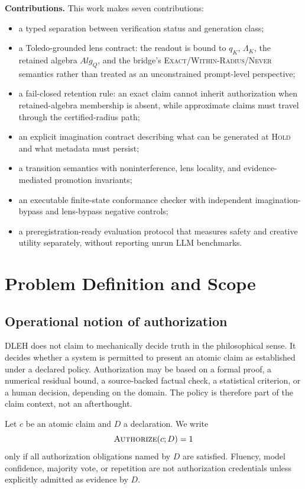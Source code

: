 \documentclass[10pt,twocolumn]{article}
\begin{document}
\noindent\textbf{Contributions.} This work makes seven contributions:
\begin{itemize}[leftmargin=1.4em,itemsep=1pt,topsep=2pt]
\item a typed separation between verification status and generation class;
\item a Toledo-grounded lens contract: the readout is bound to $q_K$, $\Lambda_K$, the retained algebra $Alg_Q$, and the bridge's \textsc{Exact}/\textsc{Within-Radius}/\textsc{Never} semantics rather than treated as an unconstrained prompt-level perspective;
\item a fail-closed retention rule: an exact claim cannot inherit authorization when retained-algebra membership is absent, while approximate claims must travel through the certified-radius path;
\item an explicit imagination contract describing what can be generated at \textsc{Hold} and what metadata must persist;
\item a transition semantics with noninterference, lens locality, and evidence-mediated promotion invariants;
\item an executable finite-state conformance checker with independent imagination-bypass and lens-bypass negative controls;
\item a preregistration-ready evaluation protocol that measures safety and creative utility separately, without reporting unrun LLM benchmarks.
\end{itemize}

\section{Problem Definition and Scope}

\subsection{Operational notion of authorization}
DLEH does not claim to mechanically decide truth in the philosophical sense. It decides whether a system is permitted to present an atomic claim as established under a declared policy. Authorization may be based on a formal proof, a numerical residual bound, a source-backed factual check, a statistical criterion, or a human decision, depending on the domain. The policy is therefore part of the claim context, not an afterthought.

Let $c$ be an atomic claim and $D$ a declaration. We write
\begin{equation}
\textsc{Authorize}(c; D) = 1
\end{equation}
only if all authorization obligations named by $D$ are satisfied. Fluency, model confidence, majority vote, or repetition are not authorization credentials unless explicitly admitted as evidence by $D$.
\end{document}
